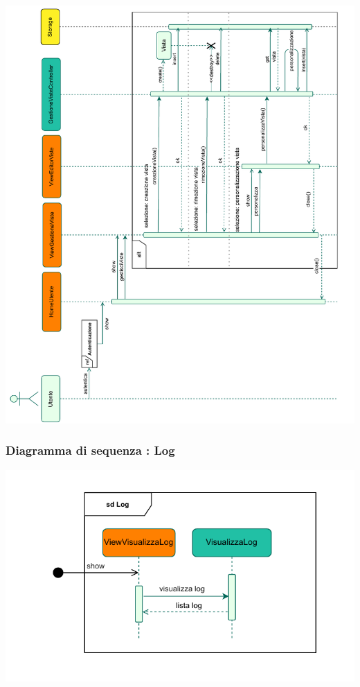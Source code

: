 \begin{adjustwidth}{-2cm}{0cm}
\includegraphics[scale=0.85]{interazione/Package-Interazione-AreaPersonale.drawio.pdf}
\end{adjustwidth}


\subsubsection*{Diagramma di sequenza : Log}
\vspace{0.5cm}

\begin{adjustwidth}{1cm}{0cm}
\includegraphics[scale=1]{interazione/Package-Interazione-Log.drawio.pdf}
\end{adjustwidth}
